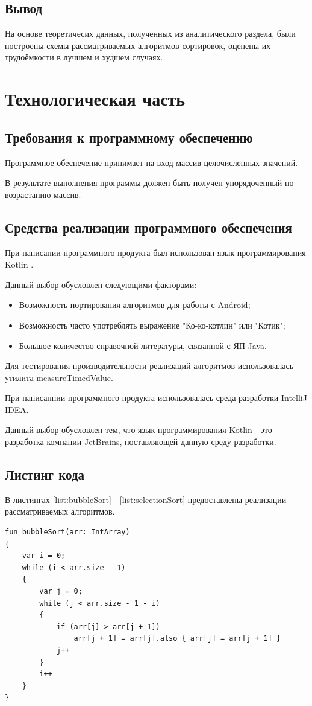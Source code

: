 \documentclass[12pt]{report}
\begin{document}
\section*{Вывод}
На основе теоретичесих данных, полученных из аналитического раздела, были построены схемы рассматриваемых алгоритмов сортировок, оценены их трудоёмкости в лучшем и худшем случаях.

\chapter{Технологическая часть}
\section{Требования к программному обеспечению}
Программное обеспечение принимает на вход массив целочисленных значений.

В результате выполнения программы должен быть получен упорядоченный по возрастанию массив.

\section{Средства реализации программного обеспечения}
При написании программного продукта был использован язык программирования Kotlin \cite{Kotlin}.

Данный выбор обусловлен следующими факторами:
\begin{itemize}
\item Возможность портирования алгоритмов для работы с Android;
\item Возможность часто употреблять выражение "Ко-ко-котлин" или "Котик";
\item Большое количество справочной литературы, связанной с ЯП Java.
\end{itemize}

Для тестирования производительности реализаций алгоритмов использовалась утилита measureTimedValue.

При написаннии программного продукта использовалась среда разработки IntelliJ IDEA.

Данный выбор обусловлен тем, что язык программирования Kotlin - это разработка компании JetBrains, поставляющей данную среду разработки.

\section{Листинг кода}
В листингах \ref{list:bubbleSort} - \ref{list:selectionSort} предоставлены реализации рассматриваемых алгоритмов.
\begin{lstlisting}[caption=Функция реализации алгоритма сортировки пузырьком,
label={list:bubbleSort}]
fun bubbleSort(arr: IntArray)
{
    var i = 0;
    while (i < arr.size - 1)
    {
        var j = 0;
        while (j < arr.size - 1 - i)
        {
            if (arr[j] > arr[j + 1])
                arr[j + 1] = arr[j].also { arr[j] = arr[j + 1] }
            j++
        }
        i++
    }
}
\end{lstlisting}
\end{document}
